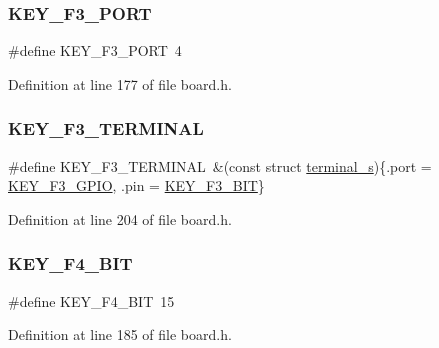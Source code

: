 \subsubsection{\texorpdfstring{K\+E\+Y\+\_\+\+F3\+\_\+\+P\+O\+RT}{KEY\_F3\_PORT}}
{\footnotesize\ttfamily \#define K\+E\+Y\+\_\+\+F3\+\_\+\+P\+O\+RT~4}



Definition at line 177 of file board.\+h.

\mbox{\label{group__hal_ga407d2cd21ce7ba2bca291fa83db88c6e}} 
\subsubsection{\texorpdfstring{K\+E\+Y\+\_\+\+F3\+\_\+\+T\+E\+R\+M\+I\+N\+AL}{KEY\_F3\_TERMINAL}}
{\footnotesize\ttfamily \#define K\+E\+Y\+\_\+\+F3\+\_\+\+T\+E\+R\+M\+I\+N\+AL~\&(const struct \hyperlink{structterminal__s}{terminal\+\_\+s})\{.port = \hyperlink{group__hal_gac7de7a3e791e70cb61e1ba74c23fd8f3}{K\+E\+Y\+\_\+\+F3\+\_\+\+G\+P\+IO}, .pin = \hyperlink{group__hal_ga0b750ff71397168903bb9406b4a0bc43}{K\+E\+Y\+\_\+\+F3\+\_\+\+B\+IT}\}}



Definition at line 204 of file board.\+h.

\mbox{\label{group__hal_gadd1233da3fb79555176e60c1433f5d2c}} 
\subsubsection{\texorpdfstring{K\+E\+Y\+\_\+\+F4\+\_\+\+B\+IT}{KEY\_F4\_BIT}}
{\footnotesize\ttfamily \#define K\+E\+Y\+\_\+\+F4\+\_\+\+B\+IT~15}



Definition at line 185 of file board.\+h.

\mbox{\label{group__hal_gabc1b6065dd7a4f9e7c7eb492f7d3d548}} 
